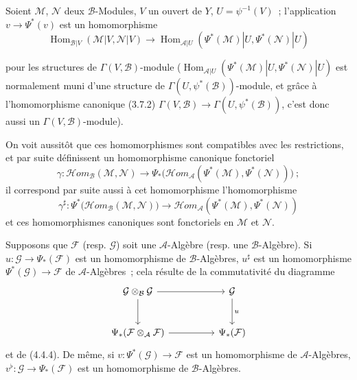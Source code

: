 \begin{env}[4.4.6]
\label{0.4.4.6-fr}
Soient $\mathcal{M}$, $\mathcal{N}$ deux $\mathcal{B}$-Modules, $V$ un ouvert
de $Y$, $U=\psi^{-1}(V)$~; l'application $v\to\Psi^*(v)$ est un
homomorphisme
\[
  \operatorname{Hom}_{\mathcal{B}|V}(\mathcal{M}|V,\mathcal{N}|V)
  \longrightarrow
  \operatorname{Hom}_{\mathcal{A}|U}
  (\Psi^*(\mathcal{M})|U,\Psi^*(\mathcal{N})|U)
\]
\begin{sloppypar}
pour les structures de $\Gamma(V,\mathcal{B})$-module
($\operatorname{Hom}_{\mathcal{A}|U}
(\Psi^*(\mathcal{M})|U,\allowbreak\Psi^*(\mathcal{N})|U)$ est normalement muni d'une
structure de $\Gamma(U,\psi^*(\mathcal{B}))$-module, et grâce à
l'homomorphisme
canonique (3.7.2)
$\Gamma(V,\mathcal{B})\to\Gamma(U,\psi^*(\mathcal{B}))$, c'est donc aussi un
$\Gamma(V,\mathcal{B})$-module).
\end{sloppypar}
On voit aussitôt que ces homomorphismes sont
compatibles avec les restrictions, et par suite définissent un homomorphisme
canonique fonctoriel
\[
  \gamma:\mathcal{H}\!om_{\mathcal{B}}(\mathcal{M},\mathcal{N})
  \longrightarrow
  \Psi_*\bigl(\mathcal{H}\!om_{\mathcal{A}}
  (\Psi^*(\mathcal{M}),\Psi^*(\mathcal{N}))\bigr)~;
\]
il correspond par suite aussi à cet homomorphisme l'homomorphisme
\[
  \gamma^\sharp:
  \Psi^*\bigl(\mathcal{H}\!om_{\mathcal{B}}(\mathcal{M},\mathcal{N})\bigr)
  \longrightarrow
  \mathcal{H}\!om_{\mathcal{A}}
  (\Psi^*(\mathcal{M}),\Psi^*(\mathcal{N}))
\]
et ces homomorphismes canoniques sont fonctoriels en $\mathcal{M}$ et
$\mathcal{N}$.
\end{env}

\begin{env}[4.4.7]
\label{0.4.4.7-fr}
Supposons que $\mathcal{F}$ (resp. $\mathcal{G}$) soit une
$\mathcal{A}$-Algèbre (resp. une $\mathcal{B}$-Algèbre). Si
$u:\mathcal{G}\to\Psi_*(\mathcal{F})$ est un homomorphisme de
$\mathcal{B}$-Algèbres, $u^\sharp$ est un homomorphisme
$\Psi^*(\mathcal{G})\to\mathcal{F}$ de $\mathcal{A}$-Algèbres~; cela résulte
de la commutativité du diagramme
\[
\begin{tikzcd}[column sep=huge,row sep=large]
\mathcal{G}\otimes_{\mathcal{B}}\mathcal{G}
  \arrow[r] \arrow[d]
  & \mathcal{G} \arrow[d,"u"] \\
\Psi_*(\mathcal{F}\otimes_{\mathcal{A}}\mathcal{F})
  \arrow[r]
  & \Psi_*(\mathcal{F})
\end{tikzcd}
\]
et de (4.4.4). De même, si $v:\Psi^*(\mathcal{G})\to\mathcal{F}$ est un
homomorphisme de $\mathcal{A}$-Algèbres,
$v^\flat:\mathcal{G}\to\Psi_*(\mathcal{F})$ est un homomorphisme de
$\mathcal{B}$-Algèbres.
\end{env}

